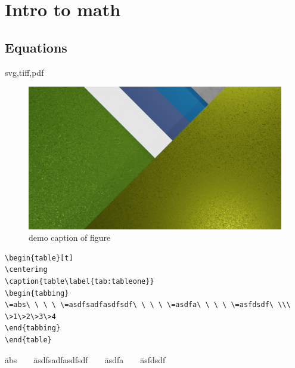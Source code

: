 \documentclass[a4paper,12pt]{book}%
\begin{document}
\section{Intro to math}


\Blindtext


\subsection{Equations}
svg,tiff,pdf

\begin{figure}[htb]%
\centering
\includegraphics[width=\linewidth]{./01.png}


\caption{demo caption of figure\label{fig:fig1}}
\end{figure}

\begin{verbatim}
\begin{table}[t]
\centering
\caption{table\label{tab:tableone}}
\begin{tabbing}
\=abs\ \ \ \ \=asdfsadfasdfsdf\ \ \ \ \=asdfa\ \ \ \ \=asfdsdf\ \\\
\>1\>2\>3\>4
\end{tabbing}
\end{table}
\end{verbatim}

\begin{table}[t]
\centering
\caption{table\label{tab:tableone}}
\begin{tabbing}
\=abs\ \ \ \ \=asdfsadfasdfsdf\ \ \ \ \=asdfa\ \ \ \ \=asfdsdf\ \\\
\end{tabbing}
\end{table}
\end{document}

